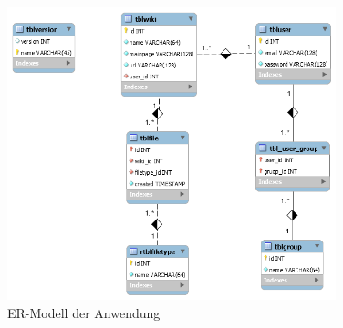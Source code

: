 \label{app:erm}
	
	\begin{figure}[H]
	\begin{center}
	\includegraphics[width=0.85\textwidth]{images/erm}	
	\caption{ER-Modell der Anwendung}	
	\end{center}
	\end{figure}
	

	